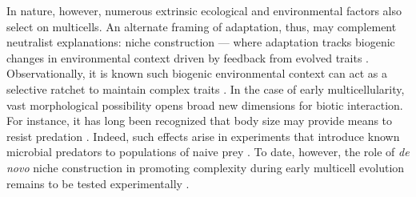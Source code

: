 In nature, however, numerous extrinsic ecological and environmental factors also select on multicells.
An alternate framing of adaptation, thus, may complement neutralist explanations: niche construction --- where adaptation tracks biogenic changes in environmental context driven by feedback from evolved traits \citep{odlingsmee2003niche,odlingsmee1988niche,levins1985dialectical}.
Observationally, it is known such biogenic environmental context can act as a selective ratchet to maintain complex traits \citep{taylor2004niche,Waddington2008,laland2014niche,creanza2016cultural}.
In the case of early multicellularity, vast morphological possibility opens broad new dimensions for biotic interaction.
For instance, it has long been recognized that body size may provide means to resist predation \citep{niklas2014evolutionary,stanley1973ecological,bonner1988evolution}.
Indeed, such effects arise in experiments that introduce known microbial predators to populations of naive prey \citep{boraas1998phagotrophy,yoshida2003rapid,herron2019denovo,pentz2015predator}.
To date, however, the role of \textit{de novo} niche construction in promoting complexity during early multicell evolution remains to be tested experimentally \citep{goldsby2012task,Joachimczak2012,goldsby2014evolutionary,bozdag2023denovo,ratcliff2012experimental,herron2016origins,kalambokidis2023multispecies}.


